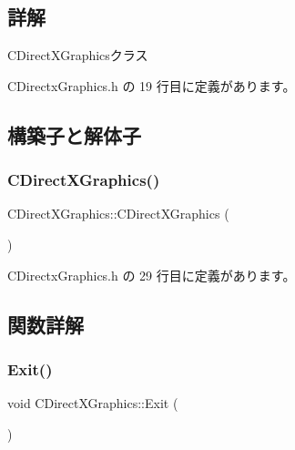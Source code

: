 \subsection{詳解}
C\+Direct\+X\+Graphicsクラス 

 C\+Directx\+Graphics.\+h の 19 行目に定義があります。



\subsection{構築子と解体子}
\mbox{\label{class_c_direct_x_graphics_ab19e1f0adafda8239186c1e29dbc4eb8}} 
\subsubsection{\texorpdfstring{C\+Direct\+X\+Graphics()}{CDirectXGraphics()}}
{\footnotesize\ttfamily C\+Direct\+X\+Graphics\+::\+C\+Direct\+X\+Graphics (\begin{DoxyParamCaption}{ }\end{DoxyParamCaption})\hspace{0.3cm}{\ttfamily [inline]}}



 C\+Directx\+Graphics.\+h の 29 行目に定義があります。



\subsection{関数詳解}
\mbox{\label{class_c_direct_x_graphics_a0c6f73fc7ecc15cf25ebeb4b85a763f1}} 
\subsubsection{\texorpdfstring{Exit()}{Exit()}}
{\footnotesize\ttfamily void C\+Direct\+X\+Graphics\+::\+Exit (\begin{DoxyParamCaption}{ }\end{DoxyParamCaption})}



